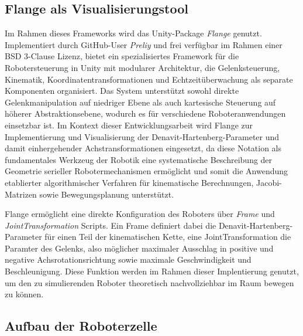 \subsection{Flange als Visualisierungstool}

Im Rahmen dieses Frameworks wird das Unity-Package
\textit{Flange} genutzt. Implementiert durch GitHub-User \textit{Preliy} und frei
verfügbar im Rahmen einer BSD 3-Clause Lizenz, bietet ein spezialisiertes
Framework für die Robotersteuerung in Unity mit modularer Architektur, die
Gelenksteuerung, Kinematik, Koordinatentransformationen und Echtzeitüberwachung
als separate Komponenten organisiert. Das System unterstützt sowohl direkte
Gelenkmanipulation auf niedriger Ebene als auch kartesische Steuerung auf
höherer Abstraktionsebene, wodurch es für verschiedene Roboteranwendungen
einsetzbar ist. Im Kontext dieser Entwicklungsarbeit wird Flange zur
Implementierung und Visualisierung der Denavit-Hartenberg-Parameter und damit
einhergehender Achstransformationen eingesetzt,
da diese Notation als fundamentales Werkzeug der Robotik eine systematische
Beschreibung der Geometrie serieller Robotermechanismen ermöglicht und somit die
Anwendung etablierter algorithmischer Verfahren für kinematische Berechnungen,
Jacobi-Matrizen sowie Bewegungsplanung unterstützt.

Flange ermöglicht eine direkte Konfiguration des Roboters über \textit{Frame}
und \textit{JointTransformation} Scripts. Ein Frame definiert dabei die
Denavit-Hartenberg-Parameter für einen Teil der kinematischen Kette, eine
JointTransformation die Paramter des Gelenks, also möglicher maximaler Ausschlag
in positive und negative Achsrotationsrichtung sowie maximale Geschwindigkeit
und Beschleunigung. Diese Funktion werden im Rahmen dieser Implentierung
genutzt, um den zu simulierenden Roboter theoretisch nachvollziehbar im Raum
bewegen zu können.

\subsection{Aufbau der Roboterzelle}


